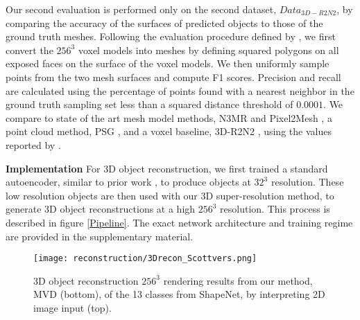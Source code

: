\documentclass{article}
\begin{document}
Our second evaluation is performed only on the second dataset, $Data_{3D-R2N2}$, by comparing the accuracy of the surfaces of predicted objects to those of the ground truth meshes. Following the evaluation procedure defined by \citet{pixel2mesh}, we first convert the $256^3$ voxel models into meshes by defining squared polygons on all exposed faces on the surface of the voxel models. We then uniformly sample points from the two mesh surfaces and compute F1 scores. Precision and recall are calculated using the percentage of points found with a nearest neighbor in the ground truth sampling set less than a squared distance threshold of $0.0001$. We compare to state of the art mesh model methods, N3MR \cite{kato2017neural} and Pixel2Mesh \cite{pixel2mesh}, a point cloud method, PSG \cite{fan2017point}, and a voxel baseline, 3D-R2N2 \cite{choy20163d}, using the values reported by \citet{pixel2mesh}.

\textbf{Implementation} \quad For 3D object reconstruction, we first trained a standard autoencoder, similar to prior work \cite{choy20163d,	3DIWGAN}, to produce objects at $32^3$ resolution. These low resolution objects are then used with our 3D super-resolution method, to generate 3D object reconstructions at a high $256^3$ resolution. This process is described in figure \ref{Pipeline}. The exact network architecture and training regime are provided in the supplementary material. 

\begin{figure*}
\texttt{[image: reconstruction/3Drecon\_Scottvers.png]}
\centering
\caption{3D object reconstruction $256^3$ rendering results from our method, MVD (bottom), of the 13 classes from ShapeNet, by interpreting 2D image input (top).} \label{fig:recons}

\end{figure*}

\begin{table}
  \caption{3D Object Reconstruction IoU at $256^3$. Cells with a dash - indicate that the corresponding result was not reported by the original author.}  \label{table:reconsIoU} \centering
\end{table}
\end{document}
